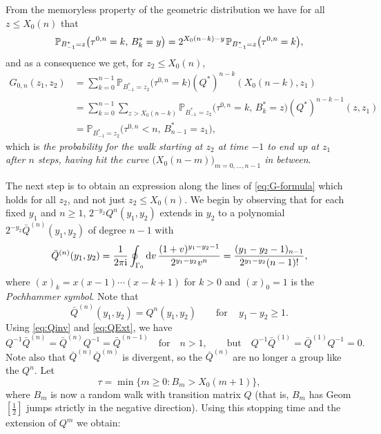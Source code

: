 \documentclass[letterpaper,reqno,11pt,oneside,final]{amsart}
\theoremstyle{definition}
\newcommand{\Qt}{Q^*}
\newcommand{\I}{\uptext{i}}
\newcommand{\pp}{\mathbb{P}}
\newcommand{\mQ}{\bar{Q}}
\newcommand{\ts}{\hspace{0.1em}}
\newcommand{\uptext}[1]{\text{\upshape{#1}}}
\renewcommand{\d}{\mathrm{d}}
\numberwithin{equation}{section}
\begin{document}
From the memoryless property of the geometric distribution we have for all $z\leq X_0(n)$ that 
\begin{equation}\label{eq:memoryless}
\pp_{B^*_{-1}=z}\big(\tau^{0,n}=k,\,B^*_k=y\big)=2^{X_0(n-k)-y}\ts\pp_{B^*_{-1}=z}\big(\tau^{0,n}=k\big),
\end{equation}
and as a consequence we get, for $z_2\leq X_0(n)$,
\begin{equation}
\begin{split}
  G_{0,n}(z_1,z_2)&=\sum_{k=0}^{n-1}\pp_{B^*_{-1}=z_2}\big(\tau^{0,n}=k\big)(\Qt)^{n-k}(X_0(n-k),z_1)\\
  &=\sum_{k=0}^{n-1}\sum_{z>X_0(n-k)}\pp_{B^*_{-1}=z_2}\big(\tau^{0,n}=k,\,B^*_k=z\big)(\Qt)^{n-k-1}(z,z_1)\\
  &=\pp_{B^*_{-1}=z_2}\big(\tau^{0,n}<n,\,B^*_{n-1}=z_1\big),
\end{split}\label{eq:G-formula}
\end{equation}
which is \emph{the probability for the walk starting at $z_2$ at time $-1$ to end up at $z_1$ after $n$ steps, having hit the curve $\big(X_0(n-m)\big)_{m=0,\dotsc,n-1}$ in between}.

The next step is to obtain an expression along the lines of \eqref{eq:G-formula} which holds for all $z_2$, and not just $z_2\leq X_0(n)$.  
We begin by observing that for each fixed $y_1$ and $n\ge 1$, $2^{-y_2}Q^n(y_1,y_2)$ extends in $y_2$ to a  polynomial $2^{-y_2}\mQ^{(n)}(y_1,y_2)$ of degree $n-1$ with 
\begin{equation}\label{eq:QExt}
\mQ^{(n)}(y_1,y_2)= \frac{1}{2\pi \I} \oint_{\Gamma_0} \d v\,\frac{(1+v)^{y_1 - y_2 -1}}{2^{y_1-y_2} v^n}= \frac{(y_1 - y_2 - 1)_{n-1}}{2^{y_1 - y_2} (n-1)!},
\end{equation}
where $(x)_k = x (x-1) \cdots (x-k+1)$ for $k > 0$ and $(x)_0=1$ is the \emph{Pochhammer symbol}. 
Note that
\begin{equation}
\mQ^{(n)}(y_1,y_2)=Q^n(y_1,y_2)\qquad\text{for}\quad\,y_1-y_2\geq1.\label{eq:QQext}
\end{equation}
Using \eqref{eq:Qinv} and \eqref{eq:QExt}, we have 
\begin{equation}\label{eq:QinvQext}
Q^{-1}\mQ^{(n)}=\mQ^{(n)}Q^{-1}=\mQ^{(n-1)}\quad\text{for}\quad n>1,\qquad\text{but}\quad Q^{-1}\mQ^{(1)}=\mQ^{(1)}Q^{-1}=0.
\end{equation}
Note also that $\mQ^{(n)}\mQ^{(m)}$ is divergent, so the $\mQ^{(n)}$ are no longer a group like the $Q^n$.
Let 
\begin{equation}
\tau= \min\{ m\ge 0: B_m> X_0(m+1)\},\label{eq:deftau}
\end{equation}
where $B_m$ is now a random walk with transition matrix $Q$ (that is, $B_m$ has Geom$[\tfrac{1}{2}]$ jumps strictly in the negative direction).
Using this stopping time and the extension of $Q^m$ we obtain:
\end{document}
